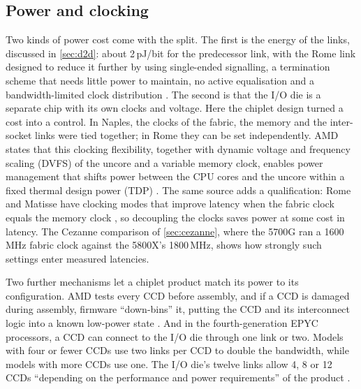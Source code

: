 \subsection{Power and clocking}
\label{sec:chiplet-power}
Two kinds of power cost come with the split. The first is the energy of the links, discussed in \cref{sec:d2d}: about 2\,pJ/bit for the predecessor link, with the Rome link designed to reduce it further by using single-ended signalling, a termination scheme that needs little power to maintain, no active equalisation and a bandwidth-limited clock distribution \cite{naffziger2020chiplet}. The second is that the I/O die is a separate chip with its own clocks and voltage. Here the chiplet design turned a cost into a control. In Naples, the clocks of the fabric, the memory and the inter-socket links were tied together; in Rome they can be set independently. AMD states that this clocking flexibility, together with dynamic voltage and frequency scaling (DVFS) of the uncore and a variable memory clock, enables power management that shifts power between the CPU cores and the uncore within a fixed thermal design power (TDP) \cite{naffziger2020chiplet}. The same source adds a qualification: Rome and Matisse have clocking modes that improve latency when the fabric clock equals the memory clock \cite{naffziger2020chiplet}, so decoupling the clocks saves power at some cost in latency. The Cezanne comparison of \cref{sec:cezanne}, where the 5700G ran a 1600\,MHz fabric clock against the 5800X's 1800\,MHz, shows how strongly such settings enter measured latencies.

Two further mechanisms let a chiplet product match its power to its configuration. AMD tests every CCD before assembly, and if a CCD is damaged during assembly, firmware ``down-bins'' it, putting the CCD and its interconnect logic into a known low-power state \cite{naffziger2020chiplet}. And in the fourth-generation EPYC processors, a CCD can connect to the I/O die through one link or two. Models with four or fewer CCDs use two links per CCD to double the bandwidth, while models with more CCDs use one. The I/O die's twelve links allow 4, 8 or 12 CCDs ``depending on the performance and power requirements'' of the product \cite{advancedmicrodevicesinc.4thGenAMD2023}.

